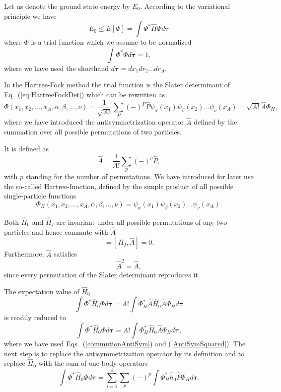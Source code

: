 \documentclass[%
oneside,                 %
final,                   %
10pt]{article}
\begin{document}
Let us denote the ground state energy by $E_0$. According to the
variational principle we have
\[
  E_0 \le E[\Phi] = \int \Phi^*\hat{H}\Phi d\mathbf{\tau}
\]
where $\Phi$ is a trial function which we assume to be normalized
\[
  \int \Phi^*\Phi d\mathbf{\tau} = 1,
\]
where we have used the shorthand $d\mathbf{\tau}=dx_1dr_2\dots dr_A$.




In the Hartree-Fock method the trial function is the Slater
determinant of Eq.~(\ref{eq:HartreeFockDet}) which can be rewritten as 
\[
  \Phi(x_1,x_2,\dots,x_A,\alpha,\beta,\dots,\nu) = \frac{1}{\sqrt{A!}}\sum_{P} (-)^P\hat{P}\psi_{\alpha}(x_1)
    \psi_{\beta}(x_2)\dots\psi_{\nu}(x_A)=\sqrt{A!}\hat{A}\Phi_H,
\]
where we have introduced the antisymmetrization operator $\hat{A}$ defined by the 
summation over all possible permutations of two particles.



It is defined as
\begin{equation}
  \hat{A} = \frac{1}{A!}\sum_{p} (-)^p\hat{P},
\label{antiSymmetryOperator}
\end{equation}
with $p$ standing for the number of permutations. We have introduced for later use the so-called
Hartree-function, defined by the simple product of all possible single-particle functions
\[
  \Phi_H(x_1,x_2,\dots,x_A,\alpha,\beta,\dots,\nu) =
  \psi_{\alpha}(x_1)
    \psi_{\beta}(x_2)\dots\psi_{\nu}(x_A).
\]


Both $\hat{H}_0$ and $\hat{H}_I$ are invariant under all possible permutations of any two particles
and hence commute with $\hat{A}$
\begin{equation}
  [H_0,\hat{A}] = [H_I,\hat{A}] = 0. \label{commutionAntiSym}
\end{equation}
Furthermore, $\hat{A}$ satisfies
\begin{equation}
  \hat{A}^2 = \hat{A},  \label{AntiSymSquared}
\end{equation}
since every permutation of the Slater
determinant reproduces it. 



The expectation value of $\hat{H}_0$ 
\[
  \int \Phi^*\hat{H}_0\Phi d\mathbf{\tau} 
  = A! \int \Phi_H^*\hat{A}\hat{H}_0\hat{A}\Phi_H d\mathbf{\tau}
\]
is readily reduced to
\[
  \int \Phi^*\hat{H}_0\Phi d\mathbf{\tau} 
  = A! \int \Phi_H^*\hat{H}_0\hat{A}\Phi_H d\mathbf{\tau},
\]
where we have used Eqs.~(\ref{commutionAntiSym}) and
(\ref{AntiSymSquared}). The next step is to replace the antisymmetrization
operator by its definition and to
replace $\hat{H}_0$ with the sum of one-body operators
\[
  \int \Phi^*\hat{H}_0\Phi  d\mathbf{\tau}
  = \sum_{i=1}^A \sum_{p} (-)^p\int 
  \Phi_H^*\hat{h}_0\hat{P}\Phi_H d\mathbf{\tau}.
\]
\end{document}
